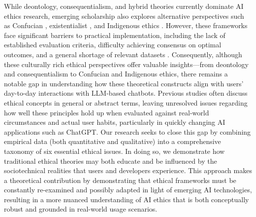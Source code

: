 \documentclass[sigconf]{acmart}
\begin{document}
While deontology, consequentialism, and hybrid theories currently dominate AI ethics research, emerging scholarship also explores alternative perspectives such as Confucian \cite{wen2019towards, zhu2020blame}, existentialist \cite{lagerkvist2024body}, and Indigenous ethics \cite{maitra2020artificial}. However, these frameworks face significant barriers to practical implementation, including the lack of established evaluation criteria, difficulty achieving consensus on optimal outcomes, and a general shortage of relevant datasets \cite{Briggle2012Ethics}. Consequently, although these culturally rich ethical perspectives offer valuable insights—from deontology and consequentialism to Confucian and Indigenous ethics, there remains a notable gap in understanding how these theoretical constructs align with users’ day-to-day interactions with LLM-based chatbots. Previous studies often discuss ethical concepts in general or abstract terms, leaving unresolved issues regarding how well these principles hold up when evaluated against real-world circumstances and actual user habits, particularly in quickly changing AI applications such as ChatGPT. Our research seeks to close this gap by combining empirical data (both quantitative and qualitative) into a comprehensive taxonomy of six essential ethical issues. In doing so, we demonstrate how traditional ethical theories may both educate and be influenced by the sociotechnical realities that users and developers experience. This approach makes a theoretical contribution by demonstrating that ethical frameworks must be constantly re-examined and possibly adapted in light of emerging AI technologies, resulting in a more nuanced understanding of AI ethics that is both conceptually robust and grounded in real-world usage scenarios.
\end{document}

